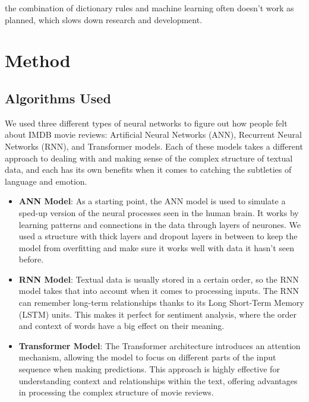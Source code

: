 \documentclass[11pt,a4paper]{article}
\begin{document}
the combination of dictionary rules and machine learning often doesn't work as planned, which slows down research and development.


\section{Method}

\subsection{Algorithms Used}

We used three different types of neural networks to figure out how people felt about IMDB movie reviews: Artificial Neural Networks (ANN), Recurrent Neural Networks (RNN), and Transformer models. Each of these models takes a different approach to dealing with and making sense of the complex structure of textual data, and each has its own benefits when it comes to catching the subtleties of language and emotion.

\begin{itemize}
    \item \textbf{ANN Model}: As a starting point, the ANN model is used to simulate a sped-up version of the neural processes seen in the human brain. It works by learning patterns and connections in the data through layers of neurones. We used a structure with thick layers and dropout layers in between to keep the model from overfitting and make sure it works well with data it hasn't seen before.
    \item \textbf{RNN Model}: Textual data is usually stored in a certain order, so the RNN model takes that into account when it comes to processing inputs. The RNN can remember long-term relationships thanks to its Long Short-Term Memory (LSTM) units. This makes it perfect for sentiment analysis, where the order and context of words have a big effect on their meaning.
    \item \textbf{Transformer Model}: The Transformer architecture introduces an attention mechanism, allowing the model to focus on different parts of the input sequence when making predictions. This approach is highly effective for understanding context and relationships within the text, offering advantages in processing the complex structure of movie reviews.
\end{itemize}
\end{document}
